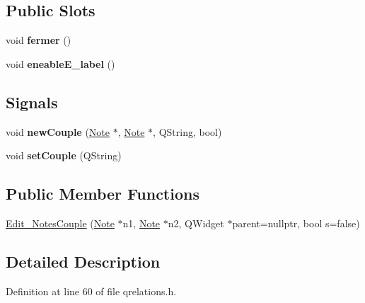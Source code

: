 \subsection*{Public Slots}
\begin{DoxyCompactItemize}
\item 
\mbox{\label{class_edit___notes_couple_a4eb0c74a8e7428aa585136878ddf1edb}} 
void {\bfseries fermer} ()
\item 
\mbox{\label{class_edit___notes_couple_ad51b47f9284bea44cddc186674c57bc9}} 
void {\bfseries eneable\+E\+\_\+label} ()
\end{DoxyCompactItemize}
\subsection*{Signals}
\begin{DoxyCompactItemize}
\item 
\mbox{\label{class_edit___notes_couple_a4cf6489e93bef94d95fe460b195ba13d}} 
void {\bfseries new\+Couple} (\hyperlink{class_note}{Note} $\ast$, \hyperlink{class_note}{Note} $\ast$, Q\+String, bool)
\item 
\mbox{\label{class_edit___notes_couple_af5c4267cc253eb46628a89e2f14dadf6}} 
void {\bfseries set\+Couple} (Q\+String)
\end{DoxyCompactItemize}
\subsection*{Public Member Functions}
\begin{DoxyCompactItemize}
\item 
\hyperlink{class_edit___notes_couple_aa0780f3a53175747c5a7136d4f2ffa30}{Edit\+\_\+\+Notes\+Couple} (\hyperlink{class_note}{Note} $\ast$n1, \hyperlink{class_note}{Note} $\ast$n2, Q\+Widget $\ast$parent=nullptr, bool s=false)
\end{DoxyCompactItemize}


\subsection{Detailed Description}


Definition at line 60 of file qrelations.\+h.



